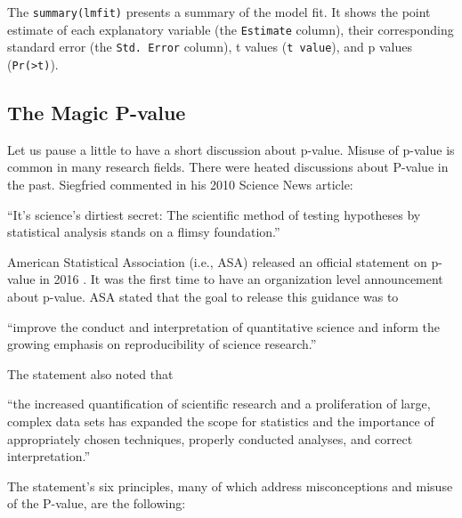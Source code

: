 \documentclass[12pt,]{krantz}
\renewenvironment{quote}{\begin{VF}}{\end{VF}}
\begin{document}
The \texttt{summary(lmfit)} presents a summary of the model fit. It shows the point estimate of each explanatory variable (the \texttt{Estimate} column), their corresponding standard error (the \texttt{Std.\ Error} column), t values (\texttt{t\ value}), and p values (\texttt{Pr(\textgreater{}\textbar{}t\textbar{})}).

\hypertarget{the-magic-p-value}{%
\subsection{The Magic P-value}\label{the-magic-p-value}}

Let us pause a little to have a short discussion about p-value. Misuse of p-value is common in many research fields. There were heated discussions about P-value in the past. Siegfried commented in his 2010 Science News article: 

\begin{quote}
``It's science's dirtiest secret: The scientific method of testing hypotheses by statistical analysis stands on a flimsy foundation.''
\end{quote}

American Statistical Association (i.e., ASA) released an official statement on p-value in 2016 \citep{ASA_P}. It was the first time to have an organization level announcement about p-value. ASA stated that the goal to release this guidance was to

\begin{quote}
``improve the conduct and interpretation of quantitative science and inform the growing emphasis on reproducibility of science research.''
\end{quote}

The statement also noted that

\begin{quote}
``the increased quantification of scientific research and a proliferation of large, complex data sets has expanded the scope for statistics and the importance of appropriately chosen techniques, properly conducted analyses, and correct interpretation.''
\end{quote}

The statement's six principles, many of which address misconceptions and misuse of the P-value, are the following:
\end{document}
